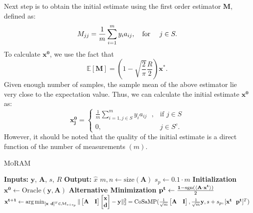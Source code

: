 Next step is to obtain the initial estimate using the first order estimator $\mathbf{M}$, defined as:
$$
M_{jj} = \frac{1}{m}\sum_{i=1}^{m}y_{i}a_{ij},~~~\textnormal{for}~~~~j \in S.
$$
To calculate $\mathbf{{x}^0}$, we use the fact that
$$
\mathbb{E}[\mathbf{M}] = \left( 1 - \sqrt{\frac{2}{\pi}}\frac{R}{2} \right) \mathbf{{x}^*}.
$$
Given enough number of samples, the sample mean of the above estimator lie very close to the expectation value. Thus, we can calculate the initial estimate $\mathbf{{x}^0}$ as:
\begin{equation}
	\mathbf{{x}^0_j} = 
	\begin{cases}
	\frac{1}{m}\sum_{i=1, j \in S}^{m}y_{i}a_{ij}~~~,& \text{if } j \in S \\
	0,              & j \in S^c.
	\end{cases}
	\label{eq:init}
\end{equation}
However, it should be noted that the quality of the initial estimate is a direct function of the number of measurements $(m)$. 


\begin{algorithm}[H]
	\caption{\textsc{MoRAM}}
	\label{alg:DMF}
	\begin{algorithmic}
		\State\textbf{Inputs:} $\mathbf{y}$, $\mathbf{A}$, $s$, $R$
		\State\textbf{Output:}  $\widehat{x}$
		\State $m,n \leftarrow \mathrm{size}(\mathbf{A})$ 
		\State $s_p \leftarrow 0.1\cdot m$
		\State \textbf{Initialization}
		\State $\mathbf{x^0} \leftarrow \textrm{Oracle}(\mathbf{y, A})$ 
		\State \textbf{Alternative Minimization}
		\State $\mathbf{{p}^{t}} \leftarrow \frac{\mathbf{1}-\mathrm{sgn}(\langle \mathbf{A} \cdot \mathbf{x^t} \rangle)}{2}$
		\State $\mathbf{{x}^{t+1}}\leftarrow \operatorname*{arg\,min}_{[\mathbf{x~d}]^T \in \mathcal{M}_{s+s_p}}\|\begin{bmatrix} \mathbf{A} & \mathbf{I} \end{bmatrix} \begin{bmatrix} \mathbf{x} \\ \mathbf{d} \end{bmatrix} - \mathbf{y}\|_2^2 = \mathrm{CoSaMP}(\frac{1}{\sqrt{m}}\begin{bmatrix} \mathbf{A} & \mathbf{I} \end{bmatrix},\frac{1}{\sqrt{m}}\mathbf{y},s+s_p,[\mathbf{x^t~~p^t}]^T)$
		\EndFor
	\end{algorithmic}
\end{algorithm}

